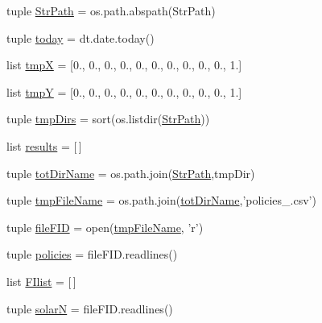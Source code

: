 \begin{DoxyCompactItemize}
\item 
tuple \hyperlink{namespacea__policies_analysis_a27fd3cf49aa14595d610558b0472b873}{Str\-Path} = os.\-path.\-abspath(Str\-Path)
\item 
tuple \hyperlink{namespacea__policies_analysis_ac936b84a5183306b66c17f9ba26eb355}{today} = dt.\-date.\-today()
\item 
list \hyperlink{namespacea__policies_analysis_ae591a2d305f300c33b635d586bfe9af8}{tmp\-X} = \mbox{[}0., 0., 0., 0., 0., 0., 0., 0., 0., 0., 1.\mbox{]}
\item 
list \hyperlink{namespacea__policies_analysis_af38c7630b769a42480102e73bb8a6fe9}{tmp\-Y} = \mbox{[}0., 0., 0., 0., 0., 0., 0., 0., 0., 0., 1.\mbox{]}
\item 
tuple \hyperlink{namespacea__policies_analysis_a8b85279e9a94c66530e0bd12ee099f1f}{tmp\-Dirs} = sort(os.\-listdir(\hyperlink{namespacea__policies_analysis_a27fd3cf49aa14595d610558b0472b873}{Str\-Path}))
\item 
list \hyperlink{namespacea__policies_analysis_aa5c33ed44128c3628bd9816f34c7d7a0}{results} = \mbox{[}$\,$\mbox{]}
\item 
tuple \hyperlink{namespacea__policies_analysis_a7eeedc08a26db83bdede1674114e614c}{tot\-Dir\-Name} = os.\-path.\-join(\hyperlink{namespacea__policies_analysis_a27fd3cf49aa14595d610558b0472b873}{Str\-Path},tmp\-Dir)
\item 
tuple \hyperlink{namespacea__policies_analysis_a657ce1f986af68f034a237ea05af0c5c}{tmp\-File\-Name} = os.\-path.\-join(\hyperlink{namespacea__policies_analysis_a7eeedc08a26db83bdede1674114e614c}{tot\-Dir\-Name},'policies\-\_.\-csv')
\item 
tuple \hyperlink{namespacea__policies_analysis_abd02c28a9fdb090c9a0c6c48a63902b5}{file\-F\-I\-D} = open(\hyperlink{namespacea__policies_analysis_a657ce1f986af68f034a237ea05af0c5c}{tmp\-File\-Name}, 'r')
\item 
tuple \hyperlink{namespacea__policies_analysis_a3a38a72cdb77dccad8b92ad3e53b3261}{policies} = file\-F\-I\-D.\-readlines()
\item 
list \hyperlink{namespacea__policies_analysis_a22c8246d8c22337c2cc70f5c70bda4fa}{F\-Ilist} = \mbox{[}$\,$\mbox{]}
\item 
tuple \hyperlink{namespacea__policies_analysis_a9359e1efd8f0e4d00093c62dd1f20592}{solar\-N} = file\-F\-I\-D.\-readlines()
\item 

\end{DoxyCompactItemize}
